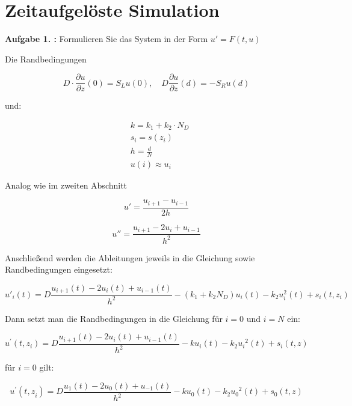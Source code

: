 \chapter{Zeitaufgelöste Simulation}
\begin{mybox}
	\textbf{Aufgabe 1. :}	Formulieren Sie das System in der Form $ u' = F(t,u) $
\end{mybox}

Die Randbedingungen

\begin{equation}
	D\cdot \frac{\partial u}{\partial z}(0)=S_Lu(0),\quad D\frac{\partial u}{\partial z}(d)=-S_Ru(d)
\end{equation}

und:

\begin{align*}
	&k=k_1+k_2\cdot N_D\\
	&s_i=s(z_i)\\
	&h=\frac{d}{N}\\
	&u(i)\approx u_i
\end{align*}

Analog wie im zweiten Abschnitt

\begin{equation}
	u' =\frac{u_{i+1} -u_{i-1}}{2h}
\end{equation}

\begin{equation}
	u''=\frac{u_{i+1} -{2u}_i +u_{i-1} }{h^2 }
\end{equation}

Anschließend werden die Ableitungen jeweils in die Gleichung sowie Randbedingungen eingesetzt:

\begin{equation}
	u'_i\left(t\right)=D\frac{u_{i+1} \left(t\right)-{2u}_i \left(t\right)+u_{i-1} \left(t\right)}{h^2 }-\left(k_1 +k_2 N_D \right)u_i\left(t\right)-k_2 u_i^2 \left(t\right)+s_i \left(t,z_i \right)
\end{equation}

Dann setzt man die Randbedingungen in die Gleichung für $ i = 0 $ und $ i = N $ ein:

\begin{equation}
	u^{\prime } \left(t,z_i \right)=D\frac{u_{i+1} \left(t\right)-{2u}_i \left(t\right)+u_{i-1} \left(t\right)}{h^2 }-ku_i \left(t\right)-k_2 {u_i }^2 \left(t\right)+s_i \left(t,z\right)
\end{equation}

für $ i = 0 $ gilt:

\begin{equation}
	u^{\prime } \left(t{,z}_i \right)=D\frac{u_1 \left(t\right)-{2u}_0 \left(t\right)+u_{-1} \left(t\right)}{h^2 }-ku_0 \left(t\right)-k_2 {u_0 }^2 \left(t\right)+s_0 \left(t,z\right)
\end{equation}

